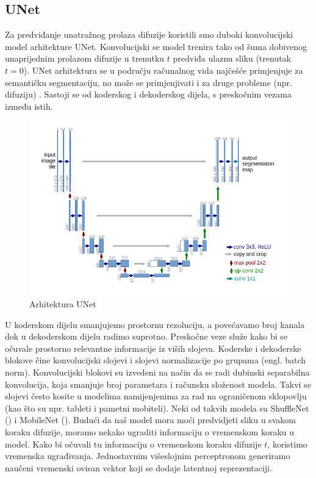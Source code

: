 \documentclass[10pt, a4paper, croatian]{article}
\begin{document}
\subsection{UNet}
Za predviđanje unatražnog prolaza difuzije koristili smo duboki konvolucijski model arhitekture UNet. Konvolucijski se model trenira tako od šuma dobivenog unaprijednim prolazom difuzije u trenutku $t$ predviđa ulaznu sliku (trenutak $t = 0$).
UNet arhitektura se u području računalnog vida najčešće primjenjuje za semantičku segmentaciju, no može se primjenjivati i za druge probleme (npr. difuziju) \cite{unet}.
Sastoji se od koderskog i dekoderskog dijela, s preskočnim vezama između istih.
\begin{figure}
	\begin{center}
	\includegraphics[width=\columnwidth]{images/unet.png}
	\caption{Arhitektura UNet \cite{unet}}
	\label{fig:figure1}
	\end{center}
\end{figure}
U koderskom dijelu smanjujemo prostornu rezoluciju, a povećavamo broj kanala dok u dekoderskom dijelu radimo suprotno. 
Preskočne veze služe kako bi se očuvale prostorno relevantne informacije iz viših slojeva. Koderske i dekoderske blokove čine konvolucijski slojevi i slojevi normalizacije po grupama (engl. batch norm).
Konvolucijski blokovi su izvedeni na način da se radi dubinski separabilna konvolucija, koja smanjuje broj parametara i računsku složenost modela. 
Takvi se slojevi često kosite u modelima namijenjenima za rad na ograničenom sklopovlju (kao što su npr. tableti i pametni mobiteli).
Neki od takvih modela su ShuffleNet (\cite{zhang2017shufflenetextremelyefficientconvolutional}) i MobileNet (\cite{howard2017mobilenetsefficientconvolutionalneural}).
Budući da naš model mora moći predvidjeti sliku u svakom koraku difuzije, moramo nekako ugraditi informaciju o vremenskom koraku u model.
Kako bi očuvali tu informaciju o vremenskom koraku difuzije $t$, koristimo vremenska ugrađivanja.
Jednostavnim višeslojnim perceptronom generiramo naučeni vremenski ovisan vektor koji se dodaje latentnoj reprezentaciji.
\end{document}

